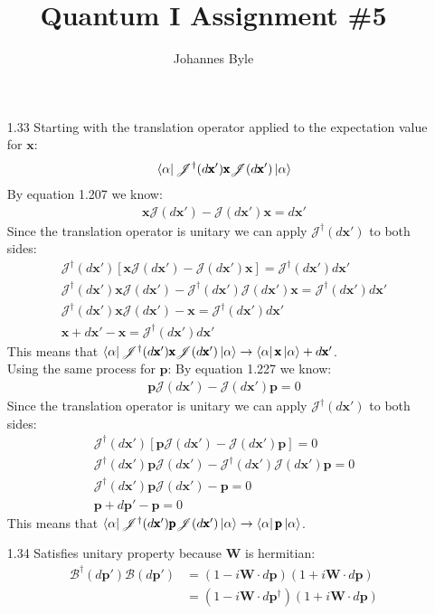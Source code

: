 \documentclass[12pt]{article}
\title{Quantum I Assignment \#5}
\author{Johannes Byle}
\newcommand{\opx}{\pmb{\text{x}}}
\newcommand{\jac}{\mathscr{J}(d\opx')}
\newcommand{\jacdag}{\mathscr{J}^{\dag}(d\opx')}
\newcommand{\opp}{\pmb{\text{p}}}
\newcommand{\boost}{\mathscr{B}(d\opp')}
\newcommand{\boostdag}{\mathscr{B}^{\dag}(d\opp')}
\newcommand{\opw}{\pmb{\text{W}}}
\begin{document}
  \maketitle
  \begin{enumerate}
    \item[1.33] Starting with the translation operator applied to the expectation value for $\opx$:
    \begin{gather*}
      \bra{\alpha}\jacdag\opx\jac\ket{\alpha}\\
    \end{gather*}
    By equation 1.207 we know:
    \begin{gather*}
      \opx\jac-\jac\opx=d\opx'
    \end{gather*}
    Since the translation operator is unitary we can apply $\jacdag$ to both sides:
    \begin{gather*}
      \jacdag\left[\opx\jac-\jac\opx\right]=\jacdag d\opx'\\
      \jacdag \opx\jac-\jacdag\jac\opx=\jacdag d\opx'\\
      \jacdag \opx\jac-\opx=\jacdag d\opx'\\
      \opx+d\opx'-\opx=\jacdag d\opx'
    \end{gather*}
    This means that $\bra{\alpha}\jacdag\opx\jac\ket{\alpha}\rightarrow\bra{\alpha}\opx\ket{\alpha}+d\opx'$.\\
    Using the same process for $\opp$:
    By equation 1.227 we know:
    \begin{gather*}
      \opp\jac-\jac\opp=0
    \end{gather*}
    Since the translation operator is unitary we can apply $\jacdag$ to both sides:
    \begin{gather*}
      \jacdag\left[\opp\jac-\jac\opp\right]=0\\
      \jacdag \opp\jac-\jacdag\jac\opp=0\\
      \jacdag \opp\jac-\opp=0\\
      \opp+d\opp'-\opp=0
    \end{gather*}
    This means that $\bra{\alpha}\jacdag\opp\jac\ket{\alpha}\rightarrow\bra{\alpha}\opp\ket{\alpha}$.\\
    \item[1.34] Satisfies unitary property because $\opw$ is hermitian:
    \begin{align*}
      \boostdag\boost&=(1-i\opw\cdot d\opp)(1+i\opw\cdot d\opp)\\
      &=(1-i\opw\cdot d\opp^{\dagger})(1+i\opw\cdot d\opp)\\

\end{align*}
\end{enumerate}
\end{document}

